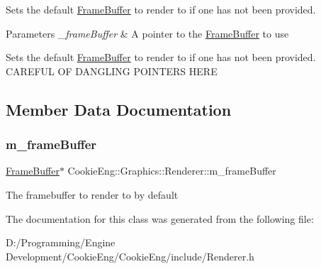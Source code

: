 Sets the default \hyperlink{class_cookie_eng_1_1_graphics_1_1_frame_buffer}{Frame\+Buffer} to render to if one has not been provided. 


\begin{DoxyParams}{Parameters}
{\em \+\_\+frame\+Buffer} & A pointer to the \hyperlink{class_cookie_eng_1_1_graphics_1_1_frame_buffer}{Frame\+Buffer} to use\\
\hline
\end{DoxyParams}
Sets the default \hyperlink{class_cookie_eng_1_1_graphics_1_1_frame_buffer}{Frame\+Buffer} to render to if one has not been provided. C\+A\+R\+E\+F\+UL OF D\+A\+N\+G\+L\+I\+NG P\+O\+I\+N\+T\+E\+RS H\+E\+RE 

\subsection{Member Data Documentation}
\mbox{\label{class_cookie_eng_1_1_graphics_1_1_renderer_a64f992d6d2476fe2ea641f31a46f006e}} 
\subsubsection{\texorpdfstring{m\+\_\+frame\+Buffer}{m\_frameBuffer}}
{\footnotesize\ttfamily \hyperlink{class_cookie_eng_1_1_graphics_1_1_frame_buffer}{Frame\+Buffer}$\ast$ Cookie\+Eng\+::\+Graphics\+::\+Renderer\+::m\+\_\+frame\+Buffer\hspace{0.3cm}{\ttfamily [protected]}}

The framebuffer to render to by default 

The documentation for this class was generated from the following file\+:\begin{DoxyCompactItemize}
\item 
D\+:/\+Programming/\+Engine Development/\+Cookie\+Eng/\+Cookie\+Eng/include/Renderer.\+h\end{DoxyCompactItemize}
